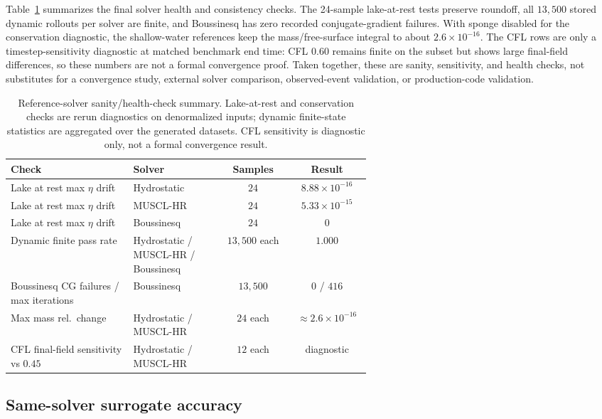 Table~\ref{tab:solver-validation} summarizes the final solver health and consistency checks. The 24-sample lake-at-rest tests preserve roundoff, all $13{,}500$ stored dynamic rollouts per solver are finite, and Boussinesq has zero recorded conjugate-gradient failures. With sponge disabled for the conservation diagnostic, the shallow-water references keep the mass/free-surface integral to about $2.6 \times 10 ^ {-16}$. The CFL rows are only a timestep-sensitivity diagnostic at matched benchmark end time: CFL $0.60$ remains finite on the subset but shows large final-field differences, so these numbers are not a formal convergence proof. Taken together, these are sanity, sensitivity, and health checks, not substitutes for a convergence study, external solver comparison, observed-event validation, or production-code validation.

\begin{table}[H]
\centering
\caption{Reference-solver sanity/health-check summary. Lake-at-rest and conservation checks are rerun diagnostics on denormalized inputs; dynamic finite-state statistics are aggregated over the generated datasets. CFL sensitivity is diagnostic only, not a formal convergence result.}
\label{tab:solver-validation}
\begin{tabular}{p{0.34\linewidth}p{0.25\linewidth}cc}
    \toprule
    Check & Solver & Samples & Result \\
    \midrule
    Lake at rest max $\eta$ drift           & Hydrostatic & $24$ & $8.88 \times 10 ^ {-16}$ \\
    Lake at rest max $\eta$ drift           & MUSCL-HR    & $24$ & $5.33 \times 10 ^ {-15}$ \\
    Lake at rest max $\eta$ drift           & Boussinesq  & $24$ & $0$ \\
    Dynamic finite pass rate                & Hydrostatic / MUSCL-HR / Boussinesq & $13{,}500$ each & $1.000$ \\
    Boussinesq CG failures / max iterations & Boussinesq  & $13{,}500$ & $0$ / $416$ \\
    Max mass rel.\ change                   & Hydrostatic / MUSCL-HR & $24$ each & $\approx 2.6 \times 10 ^ {-16}$ \\
    CFL final-field sensitivity vs $0.45$   & Hydrostatic / MUSCL-HR & $12$ each & diagnostic \\
    \bottomrule
\end{tabular}
\end{table}

\subsection{Same-solver surrogate accuracy}
\label{subsec:res-accuracy}

